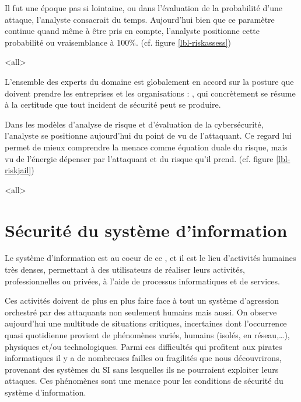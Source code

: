 
Il fut une époque pas si lointaine, ou dans l'évaluation de la probabilité d'une attaque, l'analyste consacrait du temps. Aujourd'hui bien que ce paramètre continue quand même à être pris en compte, l'analyste positionne cette probabilité ou vraisemblance à 100\%.  (cf. figure \ref{lbl-riskassess})



\mode<all>{}

L'ensemble des experts du domaine est globalement en accord sur la posture que doivent prendre les entreprises et les organisations : , qui concrètement se résume à la certitude que tout incident de sécurité peut se produire.
 
Dans les modèles d'analyse de risque et d'évaluation de la cybersécurité, l'analyste se positionne aujourd'hui du point de vu de l'attaquant. Ce regard lui permet de mieux comprendre la menace comme équation duale du risque, mais vu de l'énergie dépenser par l'attaquant et du risque qu'il prend. (cf. figure \ref{lbl-riskjail})



\mode<all>{}


\section{Sécurité du système d'information}

Le système d'information est au coeur de ce , et il est le lieu d'activités humaines très denses, permettant à des utilisateurs de réaliser leurs activités, professionnelles ou privées, à l'aide de processus informatiques et de services. 

Ces activités doivent de plus en plus faire face à tout un système d'agression orchestré par des attaquants non seulement humains mais aussi. On observe aujourd'hui une multitude de situations critiques, incertaines dont l'occurrence quasi quotidienne provient de phénomènes variés, humains (isolés, en réseau,…), physiques et/ou technologiques. Parmi ces difficultés qui profitent aux pirates informatiques il y a de nombreuses failles ou fragilités que nous découvrirons, provenant des systèmes du SI sans lesquelles ils ne pourraient exploiter leurs attaques. Ces phénomènes sont une menace pour les conditions de sécurité du système d'information.

